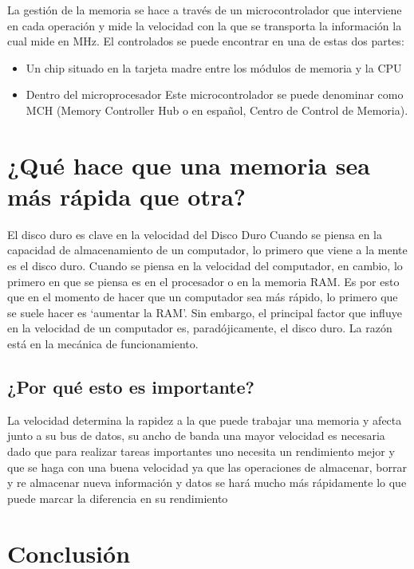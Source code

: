 \documentclass{article}
\begin{document}
La gestión de la memoria se hace a través de un microcontrolador que interviene en cada operación y mide la velocidad con la que se transporta la información la cual mide en MHz. El controlados se puede encontrar en una de estas dos partes:
\begin{itemize}
\item{ Un chip situado en la tarjeta madre entre los módulos de memoria y la CPU}
\end{itemize}

\begin{itemize}
\item{ Dentro del microprocesador Este microcontrolador se puede denominar como MCH (Memory Controller Hub o en español, Centro de Control de Memoria).}
\end{itemize}


\section{¿Qué hace que una memoria sea más rápida que otra?}

El disco duro es clave en la velocidad del Disco Duro Cuando se piensa en la capacidad de almacenamiento de un computador, lo primero que viene a la mente es el disco duro. Cuando se piensa en la velocidad del computador, en cambio, lo primero en que se piensa es en el procesador o en la memoria RAM. Es por esto que en el momento de hacer que un computador sea más rápido, lo primero que se suele hacer es ‘aumentar la RAM’. Sin embargo, el principal factor que influye en la velocidad de un computador es, paradójicamente, el disco duro. La razón está en la mecánica de funcionamiento.


\subsection{¿Por qué esto es importante?}

La velocidad determina la rapidez a la que puede trabajar una memoria y afecta junto a su bus de datos, su ancho de banda una mayor velocidad es necesaria dado que para realizar tareas importantes uno necesita un rendimiento mejor y que se haga con una buena velocidad ya que las operaciones de almacenar, borrar y re almacenar nueva información y datos se hará mucho más rápidamente lo que puede marcar la diferencia en su rendimiento



\section{Conclusión} \label{conclulsion}
\end{document}
